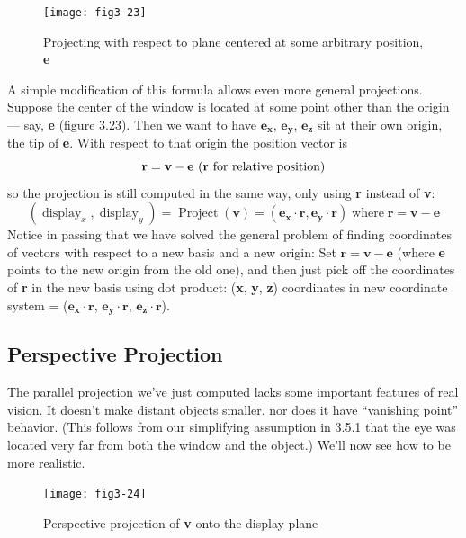 \documentclass{book}
\begin{document}
\begin{figure}
\begin{center}
\texttt{[image: fig3-23]}
\caption{Projecting with respect to plane centered at some arbitrary position, \textbf{e}}
\end{center}
\end{figure}

A simple modification of this formula allows even more general projections. Suppose the center of the window is located at some point other
than the origin --- 
say, \textbf{e} (figure 3.23). Then we want to have $\mathbf{e_x}$, $\mathbf{e_y}$, $\mathbf{e_z}$ sit
at their own origin, the tip of \textbf{e}. With respect to that origin the position
vector is
$$\mathbf{r} = \mathbf{v} - \mathbf{e} \text{ (\textbf{r} for relative position)}$$
 so the projection is still computed in the same way, only using \textbf{r} instead
of \textbf{v}:
$$(\operatorname{display}_x, \operatorname{display}_y) = \operatorname{Project}(\textbf{v}) = (\mathbf{e_x} \cdot \mathbf{r}, \mathbf{e_y} \cdot \mathbf{r}) \operatorname{where} \mathbf{r} = \mathbf{v} - \mathbf{e}$$
Notice in passing that we have solved the general problem of finding
coordinates of vectors with respect to a new basis and a new origin: Set
$\mathbf{r} = \mathbf{v} - \mathbf{e}$ (where \textbf{e} points to the new origin from the old one), and then
just pick off the coordinates of \textbf{r} in the new basis using dot product:
(\textbf{x}, \textbf{y}, \textbf{z}) coordinates in new coordinate system = ($\mathbf{e_x} \cdot \mathbf{r}$, $\mathbf{e_y} \cdot \mathbf{r}$, $\mathbf{e_z} \cdot \mathbf{r}$).

\subsection{Perspective Projection}

The parallel projection we've just computed lacks some important features of real vision. It doesn't make distant objects smaller, nor does
it have ``vanishing point'' behavior. (This follows from our simplifying
assumption in 3.5.1 that the eye was located very far from both the
window and the object.) We'll now see how to be more realistic.

\begin{figure}
\begin{center}
\texttt{[image: fig3-24]}
\caption{Perspective projection of \textbf{v} onto the display plane}
\end{center}
\end{figure}
\end{document}
